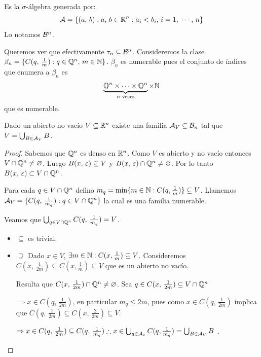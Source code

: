 \clearpage

\begin{definition}
    Es la \(\sigma\)-álgebra generada por:
    \begin{equation*}
        \mathcal{A} = \{ (a\text{, } b) : a\text{, } b \in \mathbb{R}^n : a_i < b_i \text{, } i = 1\text{, } \cdots \text{, } n \}
    \end{equation*}
    Lo notamos \(\mathcal{B}^n\).
\end{definition}

Queremos ver que efectivamente \(\tau_n \subseteq \mathcal{B}^n\).
Consideremos la clase \(\beta_n = \{ C(q\text{, } \frac{1}{m}) : q \in \mathbb{Q}^n\text{, } m \in \mathbb{N} \}\).
\(\beta_n\) es numerable pues el conjunto de índices que enumera a \(\beta_n\) es
\[ \underbrace{\mathbb{Q}^n \times \cdots \times \mathbb{Q}^n}_{n \text{ veces}} \times \mathbb{N} \] que es numerable.

\begin{prop}
    Dado un abierto no vacío \(V \subseteq \mathbb{R}^n\) existe una familia \(\mathcal{A}_V \subseteq \mathcal{B}_n\) tal que
    \(V = \bigcup_{B \in \mathcal{A}_V} B\).

    \begin{proof}
        Sabemos que \(\mathbb{Q}^n\) es denso en \(\mathbb{R}^n\). Como \(V\) es abierto y no vacío entonces \(V \cap \mathbb{Q}^n \neq \varnothing\).
        Luego \(B(x\text{, } \varepsilon) \subseteq V\) y \(B(x\text{, } \varepsilon) \cap \mathbb{Q}^n \neq \varnothing\). Por lo tanto \(B(x\text{, } \varepsilon) \subset V \cap \mathbb{Q}^n\).

        Para cada \(q \in V \cap \mathbb{Q}^n\) defino \(m_q = \min\{ m \in \mathbb{N} : C(q, \frac{1}{m}) \} \subseteq V\).
        Llamemos \(\mathcal{A}_V = \{ C(q\text{, } \frac{1}{m_q}) : q \in V \cap \mathbb{Q}^n \}\) la cual es una familia numerable.

        Veamos que \(\bigcup_{q \in V \cap \mathbb{Q}^n} C(q\text{, } \frac{1}{m_q}) = V\).
        \begin{itemize}
            \item \(\subseteq\) es trivial.
            \item \(\supseteq\) Dado \(x \in V\), \(\exists m \in \mathbb{N} : C(x, \frac{1}{m}) \subseteq V\). Consideremos
                  \(C(x\text{, } \frac{1}{2m}) \subseteq C(x, \frac{1}{m}) \subseteq V\) que es un abierto no vacío.

                  Resulta que \(C(x\text{, } \frac{1}{2m}) \cap \mathbb{Q}^n \neq \varnothing\).
                  Sea \(q \in C(x\text{, } \frac{1}{2m}) \subseteq V \cap \mathbb{Q}^n\)

                  \(\Rightarrow x \in C(q\text{, } \frac{1}{2m})\), en particular \(m_q \leq 2m\), pues como \(x \in C(q\text{, } \frac{1}{2m})\)
                  implica que \(C(q\text{, } \frac{1}{2m}) \subseteq C(x\text{, } \frac{2}{2m}) \subseteq V\).

                  \(\Rightarrow x \in C(q\text{, } \frac{1}{2m}) \subseteq C(q\text{, } \frac{1}{m_q}) \therefore x \in \bigcup_{q \in \mathcal{A}_v} C(q, \frac{1}{m_q}) = \bigcup_{B \in \mathcal{A}_V} B\) .
        \end{itemize}
    \end{proof}
\end{prop}

